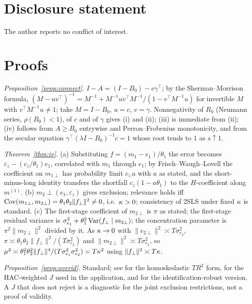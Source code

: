 \documentclass[12pt]{article}
\theoremstyle{plain}\newtheorem{theorem}{Theorem}[section]\newtheorem{proposition}[theorem]{Proposition}\newtheorem{lemma}[theorem]{Lemma}\newtheorem{corollary}[theorem]{Corollary}
\theoremstyle{definition}\newtheorem{definition}[theorem]{Definition}\newtheorem{assumption}[theorem]{Assumption}\newtheorem{remark}[theorem]{Remark}
\begin{document}
\section*{Disclosure statement}
The author reports no conflict of interest.

\appendix
\section{Proofs}
\textit{Proposition~\ref{prop:connect}.} $I-A=(I-B_0)-c\gamma^{\top}$; by the Sherman--Morrison formula, $(M-uv^{\top})^{-1}=M^{-1}+M^{-1}uv^{\top}M^{-1}/(1-v^{\top}M^{-1}u)$ for invertible $M$ with $v^{\top}M^{-1}u\ne1$; take $M=I-B_0$, $u=c$, $v=\gamma$. Nonnegativity of $R_0$ (Neumann series, $\rho(B_0)<1$), of $c$ and of $\gamma$ gives (i) and (ii); (iii) is immediate from (ii); (iv) follows from $A\ge B_0$ entrywise and Perron--Frobenius monotonicity, and from the secular equation $\gamma^{\top}(\lambda I-B_0)^{-1}c=1$ whose root tends to $1$ as $s\uparrow1$.

\textit{Theorem~\ref{thm:iv}.} (a) Substituting $f=(m_1-e_1)/\theta_1$ the error becomes $\varepsilon_z-(c_z/\theta_1)e_1$, correlated with $m_1$ through $e_1$; by Frisch--Waugh--Lovell the coefficient on $m_{1\perp}$ has probability limit $c_z\,a$ with $a$ as stated, and the short-minus-long identity transfers the shortfall $c_z(1-a\theta_1)$ to the $H$-coefficient along $m^{(1)}$. (b) $m_2\perp(e_1,\varepsilon_z)$ gives exclusion; relevance holds iff $\operatorname{Cov}(m_{1\perp},m_{2\perp})=\theta_1\theta_2\|f_\perp\|^2\ne0$, i.e.\ $\kappa>0$; consistency of 2SLS under fixed $\kappa$ is standard. (c) The first-stage coefficient of $m_{2\perp}$ is $\pi$ as stated; the first-stage residual variance is $\sigma_{e_1}^2+\theta_1^2\operatorname{Var}(f_\perp\mid m_{2\perp})$; the concentration parameter is $\pi^2\|m_{2\perp}\|^2$ divided by it. As $\kappa\to0$ with $\|e_{2\perp}\|^2\asymp T\sigma_{e_2}^2$, $\pi\asymp\theta_1\theta_2\|f_\perp\|^2/(T\sigma_{e_2}^2)$ and $\|m_{2\perp}\|^2\asymp T\sigma_{e_2}^2$, so $\mu^2\asymp\theta_1^2\theta_2^2\|f_\perp\|^4/(T\sigma_{e_1}^2\sigma_{e_2}^2)\asymp T\kappa^2$ using $\|f_\perp\|^2\asymp T\kappa$.

\textit{Proposition~\ref{prop:overid}.} Standard; see \citet{sargan1958} for the homoskedastic $TR^2$ form, \citet{hansen1982} for the HAC-weighted $J$ used in the application, and \citet{kleibergen2005} for the identification-robust version. A $J$ that does not reject is a diagnostic for the joint exclusion restrictions, not a proof of validity.
\end{document}
